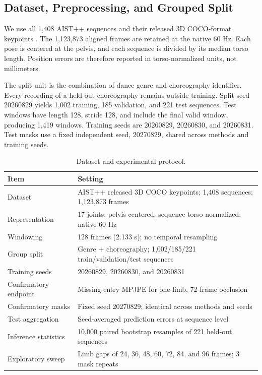 \documentclass[fractalfract,article,submit,moreauthors,pdftex]{Definitions/mdpi}
\begin{document}
\subsection{Dataset, Preprocessing, and Grouped Split}

We use all 1,408 AIST++ sequences and their released 3D COCO-format keypoints \cite{li2021aist}. The 1,123,873 aligned frames are retained at the native 60 Hz. Each pose is centered at the pelvis, and each sequence is divided by its median torso length. Position errors are therefore reported in torso-normalized units, not millimeters.

The split unit is the combination of dance genre and choreography identifier. Every recording of a held-out choreography remains outside training. Split seed 20260829 yields 1,002 training, 185 validation, and 221 test sequences. Test windows have length 128, stride 128, and include the final valid window, producing 1,419 windows. Training seeds are 20260829, 20260830, and 20260831. Test masks use a fixed independent seed, 20270829, shared across methods and training seeds.

\begin{table}[H]
\caption{Dataset and experimental protocol.\label{tab:protocol}}
\begin{tabularx}{\textwidth}{lX}
\toprule
\textbf{Item} & \textbf{Setting}\\
\midrule
Dataset & AIST++ released 3D COCO keypoints; 1,408 sequences; 1,123,873 frames\\
Representation & 17 joints; pelvis centered; sequence torso normalized; native 60 Hz\\
Windowing & 128 frames (2.133 s); no temporal resampling\\
Group split & Genre + choreography; 1,002/185/221 train/validation/test sequences\\
Training seeds & 20260829, 20260830, and 20260831\\
Confirmatory endpoint & Missing-entry MPJPE for one-limb, 72-frame occlusion\\
Confirmatory masks & Fixed seed 20270829; identical across methods and seeds\\
Test aggregation & Seed-averaged prediction errors at sequence level\\
Inference statistics & 10,000 paired bootstrap resamples of 221 held-out sequences\\
Exploratory sweep & Limb gaps of 24, 36, 48, 60, 72, 84, and 96 frames; 3 mask repeats\\
\bottomrule
\end{tabularx}
\end{table}
\end{document}
